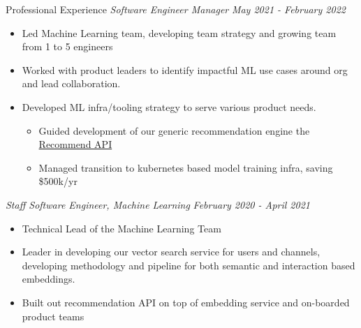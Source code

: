 \documentclass{resume} %
\begin{document}
\begin{rSection}{Professional Experience}
{\em Software Engineer Manager} \hfill {\em May 2021 - February 2022} \vspace{0.1em} 
\begin{itemize} \itemsep -0.2em
	\item Led Machine Learning team, developing team strategy and growing team from 1 to 5 engineers
	\item Worked with product leaders to identify impactful ML use cases around org and lead collaboration.
	\item Developed ML infra/tooling strategy to serve various product needs.
	\vspace{-0.2em}
        \begin{itemize} \itemsep -0.2em
            \item Guided development of our generic recommendation engine the \href{https://slack.engineering/recommend-api/}{Recommend API} 
            \item Managed transition to kubernetes based model training infra, saving \$500k/yr
        \end{itemize}
\end{itemize}
{\em Staff Software Engineer, Machine Learning} \hfill {\em February 2020 - April 2021} \vspace{0.1em} 
\begin{itemize} \itemsep -0.2em
	\item Technical Lead of the Machine Learning Team
	\item Leader in developing our vector search service for users and channels, developing methodology and pipeline for both semantic and interaction based embeddings.
	\item Built out recommendation API on top of embedding service and on-boarded product teams
\end{itemize}
 

\end{rSection}
\end{document}
